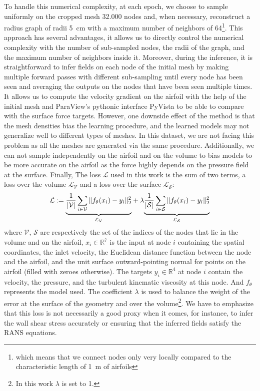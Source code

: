 To handle this numerical complexity, at each epoch, we choose to sample uniformly on the cropped mesh \SI{32.000}{} nodes and, when necessary, reconstruct a radius graph of radii \SI{5}{\centi\meter} with a maximum number of neighbors of 64\footnote{which means that we connect nodes only very locally compared to the characteristic length of \SI{1}{\meter} of airfoils}. This approach has several advantages, it allows us to directly control the numerical complexity with the number of sub-sampled nodes, the radii of the graph, and the maximum number of neighbors inside it. Moreover, during the inference, it is straightforward to infer fields on each node of the initial mesh by making multiple forward passes with different sub-sampling until every node has been seen and averaging the outputs on the nodes that have been seen multiple times. It allows us to compute the velocity gradient on the airfoil with the help of the initial mesh and ParaView's pythonic interface PyVista \cite{pyvista} to be able to compare with the surface force targets. However, one downside effect of the method is that the mesh densities bias the learning procedure, and the learned models may not generalize well to different types of meshes. In this dataset, we are not facing this problem as all the meshes are generated via the same procedure. Additionally, we can not sample independently on the airfoil and on the volume to bias models to be more accurate on the airfoil as the force highly depends on the pressure field at the surface. 
Finally, The loss $\mathcal{L}$ used in this work is the sum of two terms, a loss over the volume $\mathcal{L}_{\mathcal{V}}$ and a loss over the surface $\mathcal{L}_{\mathcal{S}}$:
\begin{equation}\label{eq:global_loss}
	\centering
	\mathcal{L}:={\underbrace{\frac{1}{|\mathcal{V}|}\sum_{i\in \mathcal{V}} \|f_\theta(x_i) - y_i\|_2^2}_{\text{$\mathcal{L}_\mathcal{V}$}}}+  \lambda{\underbrace{\frac{1}{|\mathcal{S}|}\sum_{i\in \mathcal{S}} \|f_\theta(x_i) - y_i\|_2^2}_{\text{$\mathcal{L}_\mathcal{S}$}}}
\end{equation}
where $\mathcal{V}$, $\mathcal{S}$ are respectively the set of the indices of the nodes that lie in the volume and on the airfoil, $x_i \in \mathbb{R}^{7}$ is the input at node $i$ containing the spatial coordinates, the inlet velocity, the Euclidean distance function between the node and the airfoil, and the unit surface outward-pointing normal for points on the airfoil (filled with zeroes otherwise). The targets $y_i \in \mathbb{R}^{4}$ at node $i$ contain the velocity, the pressure, and the turbulent kinematic viscosity at this node. And $f_\theta$ represents the model used. The coefficient $\lambda$ is used to balance the weight of the error at the surface of the geometry and over the volume\footnote{In this work $\lambda$ is set to 1.}. We have to emphasize that this loss is not necessarily a good proxy when it comes, for instance, to infer the wall shear stress accurately or ensuring that the inferred fields satisfy the \acrshort{RANS} equations.

